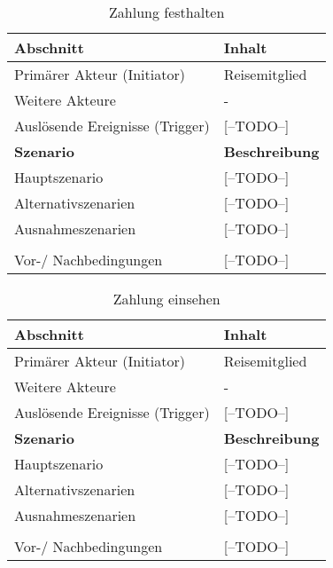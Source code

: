 \begin{table}[H]
\caption{Zahlung festhalten}
\begin{tabularx}{0.95\textwidth}{ |X|X| }
\hline
\rowcolor{gray} \textbf{Abschnitt} & \textbf{Inhalt} \\
\hline
	Primärer Akteur (Initiator) & Reisemitglied \\
\hline
	Weitere Akteure & - \\
\hline
	Auslösende Ereignisse (Trigger) & [--TODO--] \\
\hline
\rowcolor{lightgray} \textbf{Szenario} & \textbf{Beschreibung} \\
\hline
	Hauptszenario & [--TODO--] \\
\hline
  	Alternativszenarien & [--TODO--] \\
\hline
  	Ausnahmeszenarien & [--TODO--] \\
\hline
\rowcolor{lightgray} & \\
\hline
  	Vor-/ Nachbedingungen & [--TODO--] \\
\hline
\end{tabularx}
\end{table}


\begin{table}[H]
\caption{Zahlung einsehen}
\begin{tabularx}{0.95\textwidth}{ |X|X| }
\hline
\rowcolor{gray} \textbf{Abschnitt} & \textbf{Inhalt} \\
\hline
	Primärer Akteur (Initiator) & Reisemitglied \\
\hline
	Weitere Akteure & - \\
\hline
	Auslösende Ereignisse (Trigger) & [--TODO--] \\
\hline
\rowcolor{lightgray} \textbf{Szenario} & \textbf{Beschreibung} \\
\hline
	Hauptszenario & [--TODO--] \\
\hline
  	Alternativszenarien & [--TODO--] \\
\hline
  	Ausnahmeszenarien & [--TODO--] \\
\hline
\rowcolor{lightgray} & \\
\hline
  	Vor-/ Nachbedingungen & [--TODO--] \\
\hline
\end{tabularx}
\end{table}


